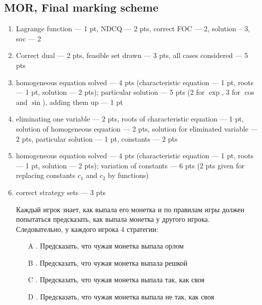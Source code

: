 \documentclass[12pt]{article} %
\theoremstyle{definition} %
\begin{document}



\subsection{MOR, Final marking scheme}

\begin{enumerate}
\item Lagrange function --- 1 pt, NDCQ --- 2 pts, correct FOC --- 2, solution -- 3, soc --- 2

\item Correct dual --- 2 pts, feasible set drawn --- 3 pts, all cases considered --- 5 pts

\item homogeneous equation solved --- 4 pts (characteristic equation --- 1 pt, roots --- 1 pt, solution --- 2 pts); particular solution --- 5 pts (2 for $\exp$, 3 for $\cos$ and $\sin$), adding them up --- 1 pt


\item eliminating one variable --- 2 pts, roots of characteristic equation --- 1 pt, solution of homogeneous equation --- 2 pts, solution for eliminated variable --- 2 pts, particular solution --- 1 pt, constants --- 2 pts


\item  homogeneous equation solved --- 4 pts (characteristic equation --- 1 pt, roots --- 1 pt, solution --- 2 pts); variation of constants --- 6 pts (2 pts given for replacing constants $c_1$ and $c_2$ by functions)

\item  correct strategy sets --- 3 pts

Каждый игрок знает, как выпала его монетка и по правилам игры должен попытаться предсказать, как выпала монетка у другого игрока. Следовательно, у каждого игрока 4 стратегии:

\begin{enumerate}
\item[A]. Предсказать, что чужая монетка выпала орлом
\item[B]. Предсказать, что чужая монетка выпала решкой
\item[C]. Предсказать, что чужая монетка выпала так, как своя
\item[D]. Предсказать, что чужая монетка выпала не так, как своя
\end{enumerate}


\end{enumerate}
\end{document}
